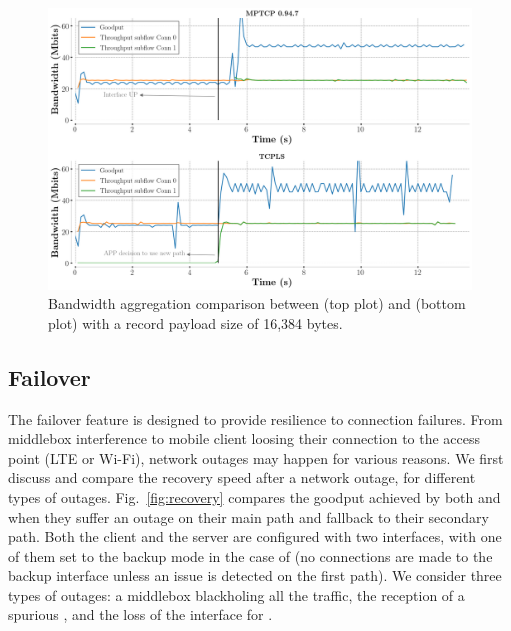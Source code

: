 \begin{figure}[!t]
  \begin{center}
    \includegraphics[width=\columnwidth]{figures/aggregate_dual.png}
  \end{center}
\vspace{-0.5cm}
  \caption{Bandwidth aggregation comparison between \mptcp (top plot) and
    \tcpls (bottom plot) with a record payload size of 16,384 bytes.}
  \label{fig:multipath_aggregation}
\end{figure}

\subsection{Failover}
\label{sec:eval_failover}

The failover feature is designed to provide resilience to \tcpls connection
failures. From middlebox interference to mobile client loosing
their connection to the access point (LTE or Wi-Fi), network outages may happen
for various reasons. We first discuss and compare the recovery speed
after a network outage, for different types of outages. Fig.~\ref{fig:recovery}
compares the goodput achieved by both \mptcp and \tcpls when they suffer an
outage on their main path and fallback to their secondary path. Both the client and the server are configured with two interfaces, with one of them set to the backup mode in the case of \mptcp (no connections are made to the backup interface unless an issue is detected on the first path). We consider three types of outages: a middlebox blackholing all the traffic, the reception of a spurious \rst, and the loss of the interface for \mptcp.

